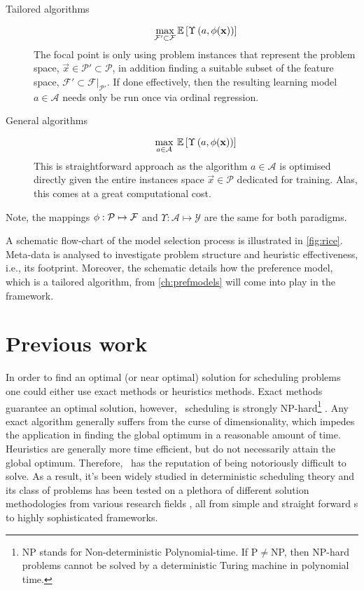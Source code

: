 \begin{description}
  \item[Tailored algorithms] 
  \begin{equation}
    \max_{\mathcal{F}'\subset\mathcal{F}} 
    {\mathbb E}\left[\Upsilon\left(a,{\mathbf{\phi}}(\mathbf{x})\right)\right]
  \end{equation}
  The  focal point is only using  problem instances that represent the problem 
  space, $\vec{x}\in\mathcal{P'}\subset\mathcal{P}$, in addition finding a 
  suitable subset of the feature space, 
  $\mathcal{F}'\subset\mathcal{F}|_{\mathcal{P}'}$. If done effectively, then 
  the resulting learning model $a\in\mathcal{A}$ needs only be run once via 
  ordinal regression.
  \item[General algorithms]
  \begin{equation}
    \max_{a\in\mathcal{A}}\:{\mathbb E}\left[\Upsilon\left(a,{\mathbf{\phi}}(\mathbf{x})\right)\right]
  \end{equation}
  This is  straightforward  approach as the algorithm $a\in\mathcal{A}$ is 
  optimised directly given the entire instances space $\vec{x}\in\mathcal{P}$ 
  dedicated for training. Alas, this comes at a great computational cost.
\end{description}
Note, the mappings ${\mathbf{\phi}}:\mathcal{P}\mapsto\mathcal{F}$ and 
$\Upsilon:\mathcal{A}\mapsto\mathcal{Y}$ are the same for both paradigms.

A schematic flow-chart of the model selection process is illustrated in 
\cref{fig:rice}. 
Meta-data is analysed to investigate problem structure and heuristic 
effectiveness, i.e., its footprint.
Moreover, the schematic details how the preference model, which is a tailored 
algorithm, from \cref{ch:prefmodels} will come into play in the framework.



\section{Previous work}
In order to find an optimal (or near optimal) solution for scheduling problems 
one could either use exact methods or heuristics methods. Exact methods 
guarantee an optimal solution, however, \jsp\ scheduling is strongly 
NP-hard\footnote{NP stands for Non-deterministic Polynomial-time.
    If P$\neq$NP, then NP-hard problems cannot be solved by a deterministic 
    Turing machine in polynomial time.}
\citep{Garey76:NPhard}. Any exact algorithm generally suffers from the curse of 
dimensionality, which impedes the application in finding the global optimum in 
a reasonable amount of time. Heuristics are generally more time efficient, but 
do not necessarily attain the global optimum. Therefore, \JSP\ has the 
reputation of being notoriously difficult to solve. As a result, it's 
been widely studied in deterministic scheduling theory and its class of 
problems has been tested on a plethora of different solution methodologies from 
various research fields \citep{Meeran12}, all from simple and straight forward 
\dr s to highly sophisticated frameworks.


